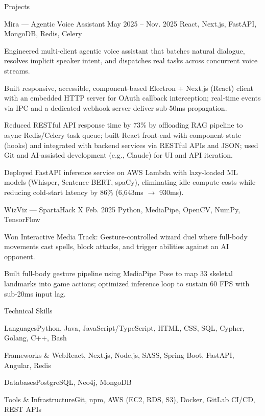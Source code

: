 \documentclass[
	11pt
]{../../../resume}
\begin{document}
	\begin{rSection}{P}{rojects}
		\begin{rSectionEntry}
			{Mira --- Agentic Voice Assistant}
			{May 2025 -- Nov. 2025}
			{}
			{React, Next.js, FastAPI, MongoDB, Redis, Celery}
			{}

			\item Engineered multi-client agentic voice assistant that batches natural dialogue, resolves implicit speaker intent, and dispatches real tasks across concurrent voice streams.
			\item Built responsive, accessible, component-based Electron + Next.js (React) client with an embedded HTTP server for OAuth callback interception; real-time events via IPC and a dedicated webhook server deliver sub-50ms propagation.
			\item Reduced RESTful API response time by 73\% by offloading RAG pipeline to async Redis/Celery task queue; built React front-end with component state (hooks) and integrated with backend services via RESTful APIs and JSON; used Git and AI-assisted development (e.g., Claude) for UI and API iteration.
			\item Deployed FastAPI inference service on AWS Lambda with lazy-loaded ML models (Whisper, Sentence-BERT, spaCy), eliminating idle compute costs while reducing cold-start latency by 86\% (6{,}643ms $\rightarrow$ 930ms).
		\end{rSectionEntry}

		\begin{rSectionEntry}
			{WizViz --- SpartaHack X}
			{Feb. 2025}
			{}
			{Python, MediaPipe, OpenCV, NumPy, TensorFlow}
			{}

			\item Won Interactive Media Track: Gesture-controlled wizard duel where full-body movements cast spells, block attacks, and trigger abilities against an AI opponent.
			\item Built full-body gesture pipeline using MediaPipe Pose to map 33 skeletal landmarks into game actions; optimized inference loop to sustain 60 FPS with sub-20ms input lag.
		\end{rSectionEntry}
	\end{rSection}

	\begin{rSection}{T}{echnical Skills}
		\begin{rSet}{Languages}{Python, Java, JavaScript/TypeScript, HTML, CSS, SQL, Cypher, Golang, C++, Bash}
		\end{rSet}
		\begin{rSet}{Frameworks \& Web}{React, Next.js, Node.js, SASS, Spring Boot, FastAPI, Angular, Redis}
		\end{rSet}
		\begin{rSet}{Databases}{PostgreSQL, Neo4j, MongoDB}
		\end{rSet}
		\begin{rSet}{Tools \& Infrastructure}{Git, npm, AWS (EC2, RDS, S3), Docker, GitLab CI/CD, REST APIs}
		\end{rSet}
	\end{rSection}
\end{document}
